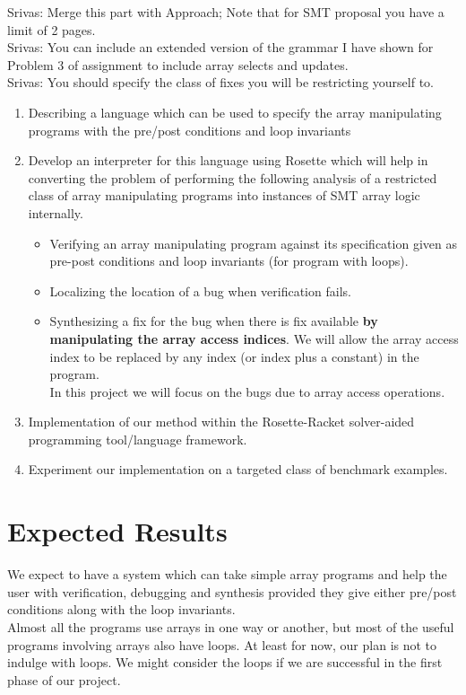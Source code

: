 \documentclass[a4paper, 12pt, notitlepage] {article}
\newcommand{\mscmt}[1]{{\color{blue} \tiny{Srivas: {#1}}}}
\begin{document}
\mscmt{Merge this part with Approach; Note that for SMT proposal you have a limit of 2 pages.} \\
\mscmt{You can include an extended version of the grammar I have shown for Problem 3 of assignment to include array selects and updates.} \\
\mscmt{You should specify the class of fixes you will be restricting yourself to.} \\

\begin{enumerate}
	\item  Describing a language which can be used to specify the array manipulating programs with the pre/post conditions and loop invariants \\
	\item Develop an interpreter for this language using Rosette which will help in converting the problem of performing the following analysis of a restricted class of array manipulating programs into instances of SMT array logic internally.
	\begin{itemize}
		\item Verifying an array manipulating program against its specification given as pre-post conditions and loop invariants (for program with loops).
		\item Localizing the location of a bug when verification fails.
		\item Synthesizing a fix for the bug when there is fix available {\bf by manipulating the array access indices}. We will allow the array access index to be replaced by any index (or index plus a constant) in the program. \\
		In this project we will focus on the bugs due to array access operations.
	\end{itemize}
	
	\item Implementation of our method within the Rosette-Racket solver-aided programming tool/language framework.\
	
	\item Experiment our implementation on a targeted class of benchmark examples.
\end{enumerate}


\section{Expected Results}
We expect to have a system which can take simple array programs and help the user with verification, debugging and synthesis provided they give either pre/post conditions along with the loop invariants.
\\
Almost all the programs use arrays in one way or another, but most of the useful programs involving arrays also have loops. At least for now, our plan is not to indulge with loops. We might consider the loops if we are successful in the first phase of our project. 
\end{document}
